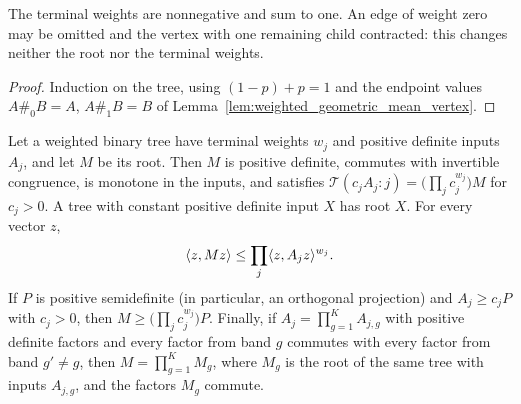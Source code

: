 \begin{lemma}\label{lem:mean_tree_weights}
    \leanok
    The terminal weights are nonnegative and sum to one. An edge of weight
    zero may be omitted and the vertex with one remaining child contracted:
    this changes neither the root nor the terminal weights.
\end{lemma}

\begin{proof}\leanok
    Induction on the tree, using $(1-p)+p=1$ and the endpoint values
    $A\#_0B=A$, $A\#_1B=B$ of Lemma~\ref{lem:weighted_geometric_mean_vertex}.
\end{proof}

\begin{theorem}\label{thm:mean_tree_properties}
    \leanok
    Let a weighted binary tree have terminal weights $w_j$ and positive
    definite inputs $A_j$, and let $M$ be its root. Then $M$ is positive
    definite, commutes with invertible congruence, is monotone in the inputs,
    and satisfies
    $\mathcal T(c_jA_j:j)=\bigl(\prod_jc_j^{w_j}\bigr)M$ for $c_j>0$.
    A tree with constant positive definite input $X$ has root $X$. For every
    vector $z$,
    \begin{align}
        \langle z,Mz\rangle\le\prod_j\langle z,A_jz\rangle^{w_j}.
        \notag
    \end{align}
    If $P$ is positive semidefinite (in particular, an orthogonal projection)
    and $A_j\ge c_jP$ with $c_j>0$, then $M\ge\bigl(\prod_jc_j^{w_j}\bigr)P$.
    Finally, if $A_j=\prod_{g=1}^KA_{j,g}$ with positive definite factors and
    every factor from band $g$ commutes with every factor from band $g'\ne g$,
    then $M=\prod_{g=1}^KM_g$, where $M_g$ is the root of the same tree with
    inputs $A_{j,g}$, and the factors $M_g$ commute.
\end{theorem}

